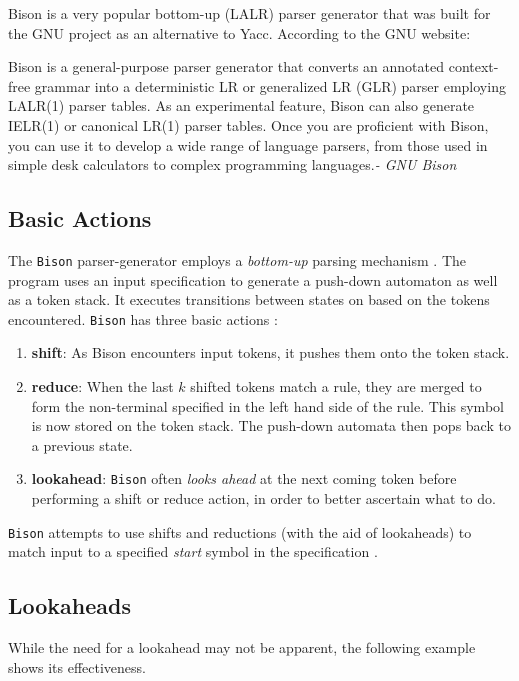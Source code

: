 Bison is a very popular bottom-up (LALR) parser generator that was built for the GNU project as an alternative to Yacc. According to the GNU website:

\begin{displayquote}
Bison is a general-purpose parser generator that converts an annotated context-free grammar into a deterministic LR or generalized LR (GLR) parser employing LALR(1) parser tables. As an experimental feature, Bison can also generate IELR(1) or canonical LR(1) parser tables. Once you are proficient with Bison, you can use it to develop a wide range of language parsers, from those used in simple desk calculators to complex programming languages.\textit{- GNU Bison} 
\end{displayquote}

\subsection{Basic Actions}

The \verb|Bison| parser-generator employs a \textit{bottom-up} parsing mechanism \cite{UnderstandingBison}. The program uses an input specification to generate a push-down automaton as well as a token stack. It executes transitions between states on based on the tokens encountered. \verb|Bison| has three basic actions \cite{Appel} \cite{BisonAlgorithm}:

\begin{enumerate}

\item \textbf{shift}: As Bison encounters input tokens, it pushes them onto the token stack.
\item \textbf{reduce}: When the last $k$ shifted tokens match a rule, they are merged to form the non-terminal specified in the left hand side of the rule. This symbol is now stored on the token stack. The push-down automata then pops back to a previous state.
\item \textbf{lookahead}: \verb|Bison| often \emph{looks ahead} at the next coming token before performing a shift or reduce action, in order to better ascertain what to do.
\end{enumerate}

\verb|Bison| attempts to use shifts and reductions (with the aid of lookaheads) to match input to a specified \textit{start} symbol in the specification \cite{BisonAlgorithm}.

\subsection{Lookaheads}
While the need for a lookahead may not be apparent, the following example shows its effectiveness.

